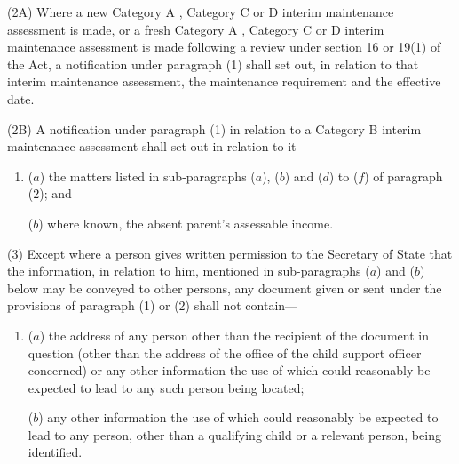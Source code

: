 \documentclass[a4paper]{article}
\begin{document}
(2A) Where a new Category A%
, Category C or D  %
interim maintenance assessment is made, or a fresh Category A%
, Category C or D  %
interim maintenance assessment is made following a review under section 16 or 19(1) of the Act, a notification under paragraph (1) shall set out, in relation to that interim maintenance assessment, the maintenance requirement and the effective date.

(2B) A notification under paragraph (1) in relation to a Category B interim maintenance assessment shall set out in relation to it—
\begin{enumerate}\item[]
($a$) the matters listed in sub-paragraphs ($a$), ($b$) and ($d$) to ($f$) of paragraph (2); and

($b$) where known, the absent parent’s assessable income.
\end{enumerate}

(3) Except where a person gives written permission to the Secretary of State that the information, in relation to him, mentioned in sub-paragraphs ($a$) and ($b$) below may be conveyed to other persons, any document given or sent under the provisions of paragraph (1) or (2) shall not contain—
\begin{enumerate}\item[]
($a$) the address of any person other than the recipient of the document in question (other than the address of the office of the child support officer concerned) or any other information the use of which could reasonably be expected to lead to any such person being located;

($b$) any other information the use of which could reasonably be expected to lead to any person, other than a qualifying child or a relevant person, being identified.
\end{enumerate}
\end{document}
